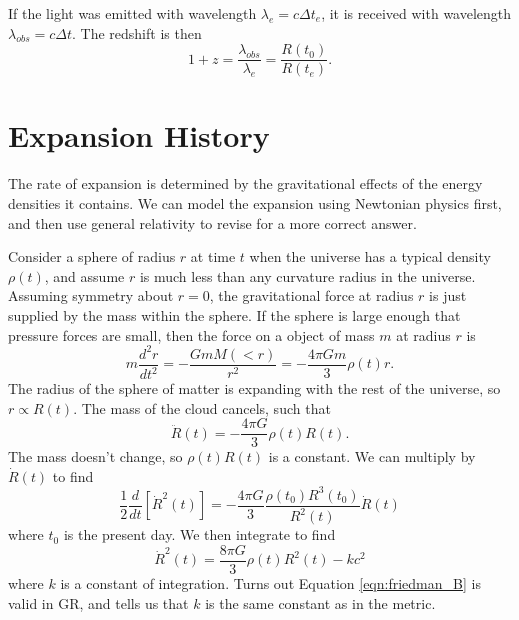 \documentclass[]{article}
\begin{document}
If the light was emitted with wavelength $\lambda_e = c \Delta t_e$, it is
received with wavelength $\lambda_{obs} = c \Delta t$.  The
redshift is then
\begin{equation}
1 + z = \frac{\lambda_{obs}}{\lambda_e} = \frac{R(t_0)}{R(t_e)}.
\end{equation}

\section{Expansion History}

The rate of expansion is determined by the gravitational effects
of the energy densities it contains.  We can model the expansion
using Newtonian physics first, and then use general relativity
to revise for a more correct answer.

Consider a sphere of radius $r$ at time $t$ when the 
universe has a typical density $\rho(t)$, and assume
$r$ is much less than any curvature radius in the 
universe.  Assuming symmetry about $r=0$, the
gravitational force at radius $r$ is just supplied by the
mass within the sphere.  If the sphere
is large enough that pressure forces are small, then
the force on a object of mass $m$ at radius $r$ is
\begin{equation}
m \frac{d^2 r}{dt^2} = - \frac{G m M(<r)}{r^2} = - \frac{4\pi Gm}{3}\rho(t)r.
\end{equation}
\noindent
The radius of the sphere of matter is expanding with the
rest of the universe, so $r\propto R(t)$.  The mass of the
cloud cancels, such that
\begin{equation}
\label{eqn:friedman_A}
\ddot{R}(t) = - \frac{4\pi G}{3} \rho(t) R(t).
\end{equation}
\noindent
The mass doesn't change, so $\rho(t) R(t)$ is a constant.
We can multiply by $\dot{R}(t)$ to find
\begin{equation}
\frac{1}{2} \frac{d}{dt}[\dot{R}^2(t)] = - \frac{4 \pi G}{3} \frac{\rho(t_0)R^3(t_0)}{R^2(t)} \dot{R}(t)
\end{equation}
\noindent
where $t_0$ is the present day.  We then integrate to find
\begin{equation}
\label{eqn:friedman_B}
\dot{R}^2(t) = \frac{8\pi G}{3}\rho(t) R^2(t) - kc^2
\end{equation}
\noindent
where $k$ is a constant of integration.  Turns out Equation
\ref{eqn:friedman_B} is valid in GR, and tells us
that $k$ is the same constant as in the metric.
\end{document}
